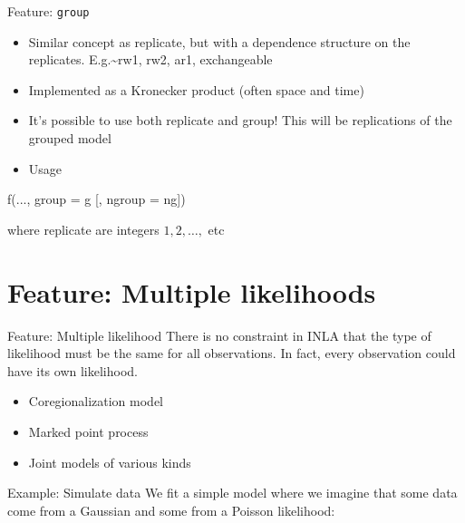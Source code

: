 \documentclass[
  ignorenonframetext,
]{beamer}
\newenvironment{Shaded}{\begin{snugshade}}{\end{snugshade}}
\newcommand{\AttributeTok}[1]{\textcolor[rgb]{0.77,0.63,0.00}{#1}}
\newcommand{\FunctionTok}[1]{\textcolor[rgb]{0.00,0.00,0.00}{#1}}
\newcommand{\NormalTok}[1]{#1}
\begin{document}
\begin{frame}[fragile]{Feature: \texttt{group}}
\protect\hypertarget{feature-group-1}{}
\begin{itemize}
\item
  Similar concept as replicate, but with a dependence structure on the
  replicates. E.g.\textasciitilde rw1, rw2, ar1, exchangeable
\item
  Implemented as a Kronecker product (often space and time)
\item
  It's possible to use both replicate and group! This will be
  replications of the grouped model
\item
  Usage
\end{itemize}

\begin{Shaded}
\begin{Highlighting}[]
    \FunctionTok{f}\NormalTok{(..., }\AttributeTok{group =}\NormalTok{ g [, }\AttributeTok{ngroup =}\NormalTok{ ng])}
\end{Highlighting}
\end{Shaded}

where replicate are integers \(1, 2, \ldots,\) etc
\end{frame}

\hypertarget{feature-multiple-likelihoods}{%
\section{Feature: Multiple
likelihoods}\label{feature-multiple-likelihoods}}

\begin{frame}{Feature: Multiple likelihood}
\protect\hypertarget{feature-multiple-likelihood}{}
There is no constraint in INLA that the type of likelihood must be the
same for all observations. In fact, every observation could have its own
likelihood.

\begin{itemize}
\item
  Coregionalization model
\item
  Marked point process
\item
  Joint models of various kinds
\end{itemize}
\end{frame}

\begin{frame}{Example: Simulate data}
\protect\hypertarget{example-simulate-data-2}{}
We fit a simple model where we imagine that some data come from a
Gaussian and some from a Poisson likelihood: \tiny

\normalsize
\end{frame}
\end{document}
